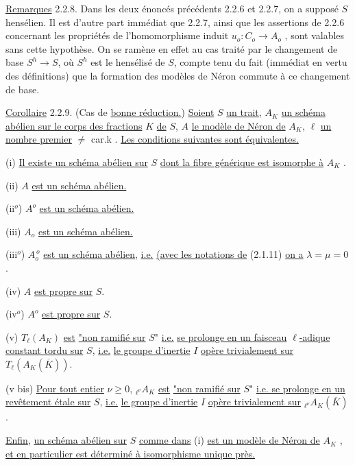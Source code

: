 \underline{Remarques} 2.2.8. Dans les deux énoncés précédents 2.2.6 et 2.2.7, on a supposé $S$ hensélien. Il est d'autre part immédiat que 2.2.7, ainsi que les assertions de 2.2.6 concernant les propriétés de l'homomorphisme induit $u_{o} : C_{o} \longrightarrow A_{o}$ , sont valables sans cette hypothèse. On se ramène en effet au cas traité par le changement de base $S^{h} \longrightarrow S$, où $S^{h}$ est le hensélisé de $S$, compte tenu du fait (immédiat en vertu des définitions) que la formation des modèles de Néron commute à ce changement de base.



\underline{Corollaire} 2.2.9. (Cas de \underline{bonne réduction.}) \underline{Soient} $S$ \underline{un trait}, $A_K$ \underline{un schéma abélien sur le corps des fractions} $K$ \underline{de} $S$, $A$ \underline{le modèle de Néron de} $A_K$, $\ell$ \underline{un nombre premier} $\neq$ car.k . \underline{Les conditions suivantes sont équivalentes.}

(i) \underline{Il existe un schéma abélien sur} $S$ \underline{dont la fibre générique est isomorphe à} $A_K$ .

(ii) $A$ \underline{est un schéma abélien.}

(ii$^o$) $A^o$ \underline{est un schéma abélien.}

(iii) $A_o$ \underline{est un schéma abélien.}

(iii$^o$) $A_o^{\,o}$ \underline{est un schéma abélien}, \underline{i.e.} \underline{(avec les notations de} (2.1.11) \underline{on a} $\lambda = \mu = 0$ .

(iv) $A$ \underline{est propre sur} $S$.

(iv$^o$) $A^o$ \underline{est propre sur} $S$.

(v) $T_\ell(A_K)$ \underline{est} \underline{"non ramifié sur} $S$" \underline{i.e.} \underline{se prolonge en un faisceau} $\ell$\underline{-adique constant tordu sur} $S$, \underline{i.e.} \underline{le groupe d'inertie} $I$ \underline{opère trivialement sur} $T_\ell(A_K(\overline{K}))$.

(v bis) \underline{Pour tout entier} $\nu \geq 0$, ${}_{\ell^\nu}A_K$ \underline{est} \underline{"non ramifié sur} $S$" \underline{i.e. se prolonge en un revêtement étale sur} $S$, \underline{i.e.} \underline{le groupe d'inertie} $I$ \underline{opère trivialement sur} ${}_{\ell^\nu}A_K(\overline{K})$.

\underline{Enfin}, \underline{un schéma abélien sur} $S$ \underline{comme dans} (i) \underline{est un modèle de Néron de} $A_K$ , \underline{et en particulier est déterminé à isomorphisme unique près.}

